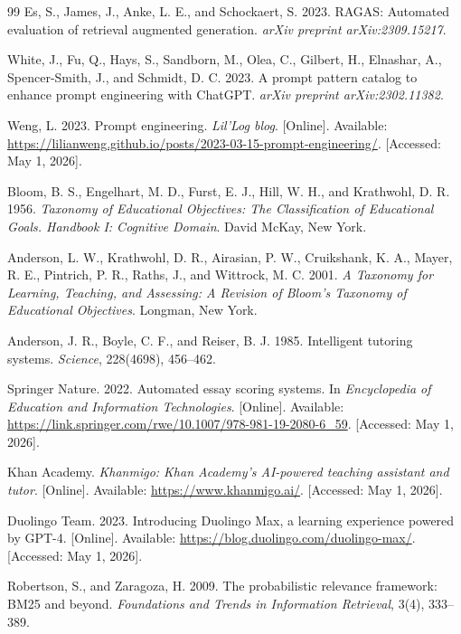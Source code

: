 \documentclass[12pt,a4paper]{article}
\begin{document}
\begin{thebibliography}{99}
Es, S., James, J., Anke, L. E., and Schockaert, S. 2023.
RAGAS: Automated evaluation of retrieval augmented generation.
\textit{arXiv preprint arXiv:2309.15217}.

White, J., Fu, Q., Hays, S., Sandborn, M., Olea, C., Gilbert, H.,
Elnashar, A., Spencer-Smith, J., and Schmidt, D. C. 2023.
A prompt pattern catalog to enhance prompt engineering with ChatGPT.
\textit{arXiv preprint arXiv:2302.11382}.

Weng, L. 2023. Prompt engineering.
\textit{Lil'Log blog}. [Online]. Available:
\url{https://lilianweng.github.io/posts/2023-03-15-prompt-engineering/}.
[Accessed: May 1, 2026].

Bloom, B. S., Engelhart, M. D., Furst, E. J., Hill, W. H., and
Krathwohl, D. R. 1956. \textit{Taxonomy of Educational Objectives:
The Classification of Educational Goals. Handbook I: Cognitive Domain}.
David McKay, New York.

Anderson, L. W., Krathwohl, D. R., Airasian, P. W., Cruikshank, K. A.,
Mayer, R. E., Pintrich, P. R., Raths, J., and Wittrock, M. C. 2001.
\textit{A Taxonomy for Learning, Teaching, and Assessing: A Revision of
Bloom's Taxonomy of Educational Objectives}. Longman, New York.

Anderson, J. R., Boyle, C. F., and Reiser, B. J. 1985.
Intelligent tutoring systems. \textit{Science}, 228(4698), 456--462.

Springer Nature. 2022. Automated essay scoring systems. In
\textit{Encyclopedia of Education and Information Technologies}.
[Online]. Available:
\url{https://link.springer.com/rwe/10.1007/978-981-19-2080-6_59}.
[Accessed: May 1, 2026].

Khan Academy. \textit{Khanmigo: Khan Academy's AI-powered teaching
assistant and tutor}. [Online]. Available:
\url{https://www.khanmigo.ai/}. [Accessed: May 1, 2026].

Duolingo Team. 2023. Introducing Duolingo Max, a learning experience
powered by GPT-4. [Online]. Available:
\url{https://blog.duolingo.com/duolingo-max/}. [Accessed: May 1, 2026].

Robertson, S., and Zaragoza, H. 2009. The probabilistic relevance
framework: BM25 and beyond. \textit{Foundations and Trends in Information
Retrieval}, 3(4), 333--389.


\end{thebibliography}
\end{document}
